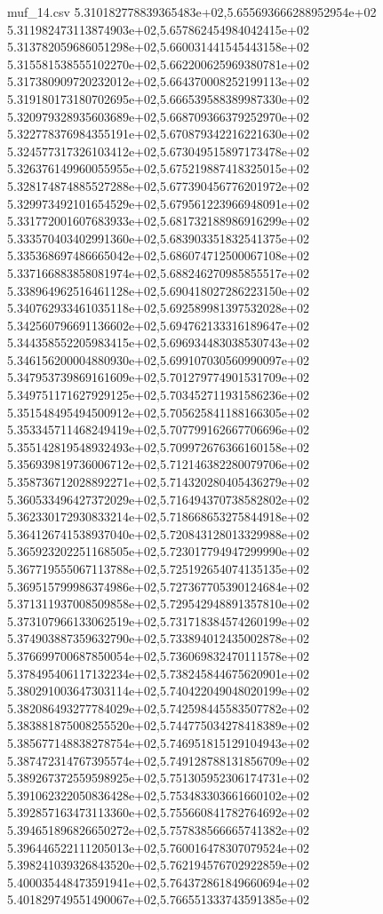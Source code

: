 \begin{filecontents*}{muf_14.csv}
5.310182778839365483e+02,5.655693666288952954e+02
5.311982473113874903e+02,5.657862454984042415e+02
5.313782059686051298e+02,5.660031441545443158e+02
5.315581538555102270e+02,5.662200625969380781e+02
5.317380909720232012e+02,5.664370008252199113e+02
5.319180173180702695e+02,5.666539588389987330e+02
5.320979328935603689e+02,5.668709366379252970e+02
5.322778376984355191e+02,5.670879342216221630e+02
5.324577317326103412e+02,5.673049515897173478e+02
5.326376149960055955e+02,5.675219887418325015e+02
5.328174874885527288e+02,5.677390456776201972e+02
5.329973492101654529e+02,5.679561223966948091e+02
5.331772001607683933e+02,5.681732188986916299e+02
5.333570403402991360e+02,5.683903351832541375e+02
5.335368697486665042e+02,5.686074712500067108e+02
5.337166883858081974e+02,5.688246270985855517e+02
5.338964962516461128e+02,5.690418027286223150e+02
5.340762933461035118e+02,5.692589981397532028e+02
5.342560796691136602e+02,5.694762133316189647e+02
5.344358552205983415e+02,5.696934483038530743e+02
5.346156200004880930e+02,5.699107030560990097e+02
5.347953739869161609e+02,5.701279774901531709e+02
5.349751171627929125e+02,5.703452711931586236e+02
5.351548495494500912e+02,5.705625841188166305e+02
5.353345711468249419e+02,5.707799162667706696e+02
5.355142819548932493e+02,5.709972676366160158e+02
5.356939819736006712e+02,5.712146382280079706e+02
5.358736712028892271e+02,5.714320280405436279e+02
5.360533496427372029e+02,5.716494370738582802e+02
5.362330172930833214e+02,5.718668653275844918e+02
5.364126741538937040e+02,5.720843128013329988e+02
5.365923202251168505e+02,5.723017794947299990e+02
5.367719555067113788e+02,5.725192654074135135e+02
5.369515799986374986e+02,5.727367705390124684e+02
5.371311937008509858e+02,5.729542948891357810e+02
5.373107966133062519e+02,5.731718384574260199e+02
5.374903887359632790e+02,5.733894012435002878e+02
5.376699700687850054e+02,5.736069832470111578e+02
5.378495406117132234e+02,5.738245844675620901e+02
5.380291003647303114e+02,5.740422049048020199e+02
5.382086493277784029e+02,5.742598445583507782e+02
5.383881875008255520e+02,5.744775034278418389e+02
5.385677148838278754e+02,5.746951815129104943e+02
5.387472314767395574e+02,5.749128788131856709e+02
5.389267372559598925e+02,5.751305952306174731e+02
5.391062322050836428e+02,5.753483303661660102e+02
5.392857163473113360e+02,5.755660841782764692e+02
5.394651896826650272e+02,5.757838566665741382e+02
5.396446522111205013e+02,5.760016478307079524e+02
5.398241039326843520e+02,5.762194576702922859e+02
5.400035448473591941e+02,5.764372861849660694e+02
5.401829749551490067e+02,5.766551333743591385e+02

\end{filecontents*}
